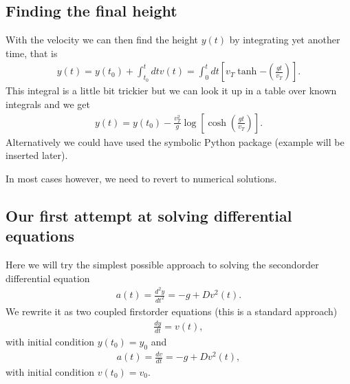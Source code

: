 \documentclass[letterpaper,10pt,english]{sphinxmanual}
\begin{document}
\subsection{Finding the final height}
\label{\detokenize{chapter2:finding-the-final-height}}
With the velocity we can then find the height \(y(t)\) by integrating yet another time, that is
\begin{equation*}
\begin{split}
y(t)=y(t_0)+\int_{t_0}^t dt v(t)=\int_{0}^t dt[v_T\tanh{-(\frac{gt}{v_T})}].
\end{split}
\end{equation*}
This integral is a little bit trickier but we can look it up in a table over
known integrals and we get
\begin{equation*}
\begin{split}
y(t)=y(t_0)-\frac{v_T^2}{g}\log{[\cosh{(\frac{gt}{v_T})}]}.
\end{split}
\end{equation*}
Alternatively we could have used the symbolic Python package   (example will be inserted later).

In most cases however, we need to revert to numerical solutions.


\subsection{Our first attempt at solving differential equations}
\label{\detokenize{chapter2:our-first-attempt-at-solving-differential-equations}}
Here we will try the simplest possible approach to solving the second\sphinxhyphen{}order differential
equation
\begin{equation*}
\begin{split}
a(t) =\frac{d^2y}{dt^2}= -g +Dv^2(t).
\end{split}
\end{equation*}
We rewrite it as two coupled first\sphinxhyphen{}order equations (this is a standard approach)
\begin{equation*}
\begin{split}
\frac{dy}{dt} = v(t),
\end{split}
\end{equation*}
with initial condition \(y(t_0)=y_0\) and
\begin{equation*}
\begin{split}
a(t) =\frac{dv}{dt}= -g +Dv^2(t),
\end{split}
\end{equation*}
with initial condition \(v(t_0)=v_0\).
\end{document}
